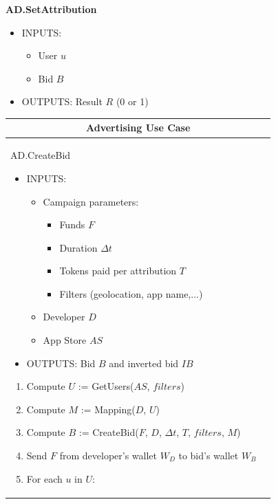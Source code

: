 \textbf{AD.SetAttribution}
\begin{itemize}
	\item INPUTS:
	\begin{itemize}
		\item User $u$
		\item Bid $B$
	\end{itemize}
	\item OUTPUTS: Result $R$ (0 or 1)
\end{itemize}

\begin{table}[H]
\scriptsize
\centering
\begin{tabular}{|p{}p{}|}
\hline
\multicolumn{2}{|c|}{Advertising Use Case} \\
\hline \vspace{0.1cm}
\textsf{AD.CreateBid}
\begin{itemize}
	\vspace{-0.3cm}
	\item INPUTS:
	\vspace{-0.4cm}
	\begin{itemize}
		\item Campaign parameters:
		\begin{itemize}
			\item Funds $F$
			\item Duration $\Delta t$
			\item Tokens paid per attribution $T$
			\item Filters (geolocation, app name,...)
		\end{itemize}
		\item Developer $D$
		\item App Store $AS$
	\end{itemize}
	\item OUTPUTS: Bid $B$ and inverted bid $IB$
\end{itemize}
\begin{enumerate}
	\item Compute $U$ := \textsf{GetUsers}($AS$, $filters$)
	\item Compute $M$ := \textsf{Mapping}($D$, $U$)
	\item Compute $B$ := \textsf{CreateBid}($F$, $D$, $\Delta t$, $T$, $filters$, $M$)
	\item Send $F$ from developer's wallet $W_D$ to bid's wallet $W_B$
	\item For each $u$ in $U$:
	\vspace{-0.3cm}
	\begin{enumerate}

\end{enumerate}
\end{enumerate}
\end{tabular}
\end{table}

